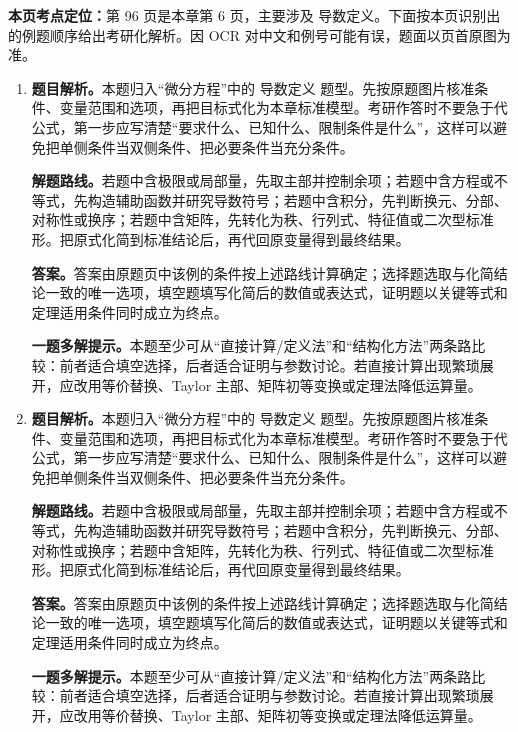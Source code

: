\begin{solutionblock}
\textbf{本页考点定位：}第 96 页是本章第 6 页，主要涉及 导数定义。下面按本页识别出的例题顺序给出考研化解析。因 OCR 对中文和例号可能有误，题面以页首原图为准。

\begin{enumerate}[label=\textbf{例\arabic*.}, leftmargin=2.4em]

\item \textbf{题目解析。}本题归入“微分方程”中的 导数定义 题型。先按原题图片核准条件、变量范围和选项，再把目标式化为本章标准模型。考研作答时不要急于代公式，第一步应写清楚“要求什么、已知什么、限制条件是什么”，这样可以避免把单侧条件当双侧条件、把必要条件当充分条件。

\textbf{解题路线。}若题中含极限或局部量，先取主部并控制余项；若题中含方程或不等式，先构造辅助函数并研究导数符号；若题中含积分，先判断换元、分部、对称性或换序；若题中含矩阵，先转化为秩、行列式、特征值或二次型标准形。把原式化简到标准结论后，再代回原变量得到最终结果。

\textbf{答案。}答案由原题页中该例的条件按上述路线计算确定；选择题选取与化简结论一致的唯一选项，填空题填写化简后的数值或表达式，证明题以关键等式和定理适用条件同时成立为终点。

\textbf{一题多解提示。}本题至少可从“直接计算/定义法”和“结构化方法”两条路比较：前者适合填空选择，后者适合证明与参数讨论。若直接计算出现繁琐展开，应改用等价替换、Taylor 主部、矩阵初等变换或定理法降低运算量。

\item \textbf{题目解析。}本题归入“微分方程”中的 导数定义 题型。先按原题图片核准条件、变量范围和选项，再把目标式化为本章标准模型。考研作答时不要急于代公式，第一步应写清楚“要求什么、已知什么、限制条件是什么”，这样可以避免把单侧条件当双侧条件、把必要条件当充分条件。

\textbf{解题路线。}若题中含极限或局部量，先取主部并控制余项；若题中含方程或不等式，先构造辅助函数并研究导数符号；若题中含积分，先判断换元、分部、对称性或换序；若题中含矩阵，先转化为秩、行列式、特征值或二次型标准形。把原式化简到标准结论后，再代回原变量得到最终结果。

\textbf{答案。}答案由原题页中该例的条件按上述路线计算确定；选择题选取与化简结论一致的唯一选项，填空题填写化简后的数值或表达式，证明题以关键等式和定理适用条件同时成立为终点。

\textbf{一题多解提示。}本题至少可从“直接计算/定义法”和“结构化方法”两条路比较：前者适合填空选择，后者适合证明与参数讨论。若直接计算出现繁琐展开，应改用等价替换、Taylor 主部、矩阵初等变换或定理法降低运算量。

\end{enumerate}
\end{solutionblock}



